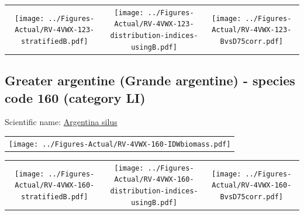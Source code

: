 \documentclass[12pt]{article}\usepackage[]{graphicx}\usepackage[]{color}
\begin{document}
\vspace{1cm}
\begin{minipage}{1.0\textwidth}
 \begin{tabular}{ccc}
\texttt{[image: ../Figures-Actual/RV-4VWX-123-stratifiedB.pdf]} & 
\texttt{[image: ../Figures-Actual/RV-4VWX-123-distribution-indices-usingB.pdf]} & 
\texttt{[image: ../Figures-Actual/RV-4VWX-123-BvsD75corr.pdf]} \\ 
\end{tabular} 
\end{minipage}
\clearpage

\renewcommand\thefigure{\thesubsection\Alph{figure}}

\setcounter{figure}{0}

\hypertarget{sec:160}{%
\subsection{Greater argentine (Grande argentine) - species code 160 (category LI)}\label{sec:160}}

  


Scientific name: \href{http://www.marinespecies.org/aphia.php?p=taxdetails\&id=126715}{Argentina silus} \newline
\begin{minipage}{1.0\textwidth}
 \begin{tabular}{c}
\texttt{[image: ../Figures-Actual/RV-4VWX-160-IDWbiomass.pdf]} \\ 
\end{tabular} 
\end{minipage}
\newline

\vspace{1cm}
\begin{minipage}{1.0\textwidth}
 \begin{tabular}{ccc}
\texttt{[image: ../Figures-Actual/RV-4VWX-160-stratifiedB.pdf]} & 
\texttt{[image: ../Figures-Actual/RV-4VWX-160-distribution-indices-usingB.pdf]} & 
\texttt{[image: ../Figures-Actual/RV-4VWX-160-BvsD75corr.pdf]} \\ 
\end{tabular} 
\end{minipage}
\clearpage
\end{document}
